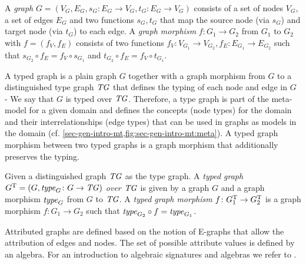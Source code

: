 \begin{definition}
A \emph{graph} $G=(V_G,E_G,s_G\colon E_G \to V_G,t_G\colon E_G \to V_G)$ consists of a set of nodes $V_G$, a set of edges $E_G$ and two functions $s_G,t_G$ that map the source node (via $s_G$) and target node (via $t_G$) to each edge.
A \emph{graph morphism} $f\colon G_1 \to G_2$ from $G_1$ to $G_2$ with $f=(f_V,f_E)$ consists of two functions $f_V\colon V_{G_1} \to V_{G_2},f_E\colon E_{G_1} \to E_{G_2}$ such that $s_{G_2} \circ f_E=f_V \circ s_{G_1}$ and $t_{G_2} \circ f_E=f_V \circ t_{G_1}$.
\envEndMarker
\end{definition}

A typed graph is a plain graph $G$ together with a graph morphism from $G$ to a distinguished type graph $\mathit{TG}$ that defines the typing of each node and edge in $G$ - We say that $G$ is typed over $\mathit{TG}$.
Therefore, a type graph is part of the meta-model for a given domain and defines the concepts (node types) for the domain and their interrelationships (edge types) that can be used in graphs as models in the domain (cf. \cref{sec-gen-intro-mt,fig:sec-gen-intro-mt:meta}).
A typed graph morphism between two typed graphs is a graph morphism that additionally preserves the typing.

\vspace{-1.5ex}

\begin{definition}
\label{def:sec-gt-graphs:typed_graphs}
Given a distinguished graph $\mathit{TG}$ as the type graph.
A \emph{typed graph $G^\mathrm{T}=(G,\mathit{type}_G\colon G \to \mathit{TG})$ over $\mathit{TG}$} is given by a graph $G$ and a graph morphism $\mathit{type}_G$ from $G$ to $\mathit{TG}$.
A \emph{typed graph morphism} $f\colon G^\mathrm{T}_1 \to G^\mathrm{T}_2$ is a graph morphism $f\colon G_1 \to G_2$ such that $\mathit{type}_{G_2} \circ f=\mathit{type}_{G_1}$.
\envEndMarker
\end{definition}

Attributed graphs are defined based on the notion of E-graphs that allow the attribution of edges and nodes.
The set of possible attribute values is defined by an algebra.
For an introduction to algebraic signatures and algebras we refer to \cite{Ehrig:2006:FAG:1121741}.

